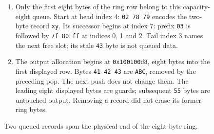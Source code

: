 \begin{figure}[htbp]
\begin{minipage}{\linewidth}
\begin{enumerate}
      \item Only the first eight bytes of the ring row belong to this capacity-eight queue. Start at head index 4: \texttt{02 78 79} encodes the two-byte record \texttt{xy}. Its successor begins at index 7: prefix \texttt{03} is followed by \texttt{7f 80 ff} at indices 0, 1 and 2. Tail index 3 names the next free slot; its stale \texttt{43} byte is not queued data.
      \item The output allocation begins at \texttt{0x100100d8}, eight bytes into the first displayed row. Bytes \texttt{41 42 43} are \texttt{ABC}, removed by the preceding pop. The next push does not change them. The leading eight displayed bytes are guards; subsequent \texttt{55} bytes are untouched output. Removing a record did not erase its former ring bytes.
    \end{enumerate}
  \end{minipage}
  \caption{Two queued records span the physical end of the eight-byte ring.}
  \label{capture:014-ring-buffer-logger-f01-wrap}
  \label{ring-f01-wrap}
\end{figure}
\par

